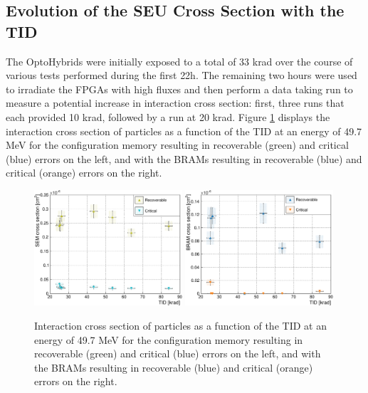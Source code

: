     \subsection{Evolution of the SEU Cross Section with the TID}

      The OptoHybrids were initially exposed to a total of 33 krad over the course of various tests performed during the first 22h. The remaining two hours were used to irradiate the FPGAs with high fluxes and then perform a data taking run to measure a potential increase in interaction cross section: first, three runs that each provided 10 krad, followed by a run at 20 krad. Figure \ref{fig:II-5-data-seu-tid} displays the interaction cross section of particles as a function of the TID at an energy of 49.7 MeV for the configuration memory resulting in recoverable (green) and critical (blue) errors on the left, and with the BRAMs resulting in recoverable (blue) and critical (orange) errors on the right. \\

      \begin{figure}[t!]
        \centering
        \includegraphics[width=0.49\textwidth]{img/plots/cDose_SEM-crop}
        \includegraphics[width=0.49\textwidth]{img/plots/cDose_BRAM-crop}
        \caption{Interaction cross section of particles as a function of the TID at an energy of 49.7 MeV for the configuration memory resulting in recoverable (green) and critical (blue) errors on the left, and with the BRAMs resulting in recoverable (blue) and critical (orange) errors on the right.}
        \label{fig:II-5-data-seu-tid}
      \end{figure}

